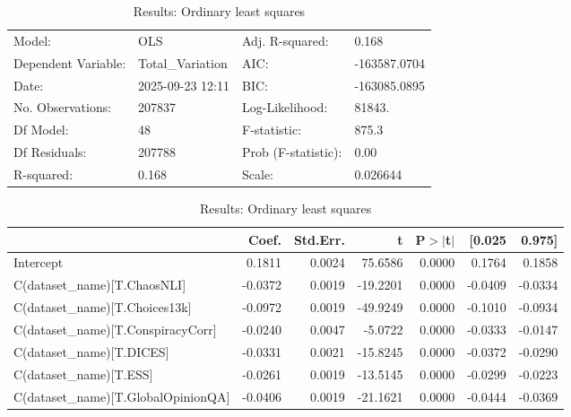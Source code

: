 \documentclass{article} %
\begin{document}
\begin{table}
\tiny
\caption{Results: Ordinary least squares}
\label{tab:regression_entropy}
\begin{center}
\begin{tabular}{llll}
\hline
Model:              & OLS              & Adj. R-squared:     & 0.168         \\
Dependent Variable: & Total\_Variation & AIC:                & -163587.0704  \\
Date:               & 2025-09-23 12:11 & BIC:                & -163085.0895  \\
No. Observations:   & 207837           & Log-Likelihood:     & 81843.        \\
Df Model:           & 48               & F-statistic:        & 875.3         \\
Df Residuals:       & 207788           & Prob (F-statistic): & 0.00          \\
R-squared:          & 0.168            & Scale:              & 0.026644      \\
\hline
\end{tabular}
\end{center}
\begin{center}
\begin{tabular}{lrrrrrr}
\hline
                                                       &   Coef. & Std.Err. &         t & P$> |$t$|$ &  [0.025 &  0.975]  \\
\hline
Intercept                                              &  0.1811 &   0.0024 &   75.6586 &      0.0000 &  0.1764 &  0.1858  \\
C(dataset\_name)[T.ChaosNLI]                           & -0.0372 &   0.0019 &  -19.2201 &      0.0000 & -0.0409 & -0.0334  \\
C(dataset\_name)[T.Choices13k]                         & -0.0972 &   0.0019 &  -49.9249 &      0.0000 & -0.1010 & -0.0934  \\
C(dataset\_name)[T.ConspiracyCorr]                     & -0.0240 &   0.0047 &   -5.0722 &      0.0000 & -0.0333 & -0.0147  \\
C(dataset\_name)[T.DICES]                              & -0.0331 &   0.0021 &  -15.8245 &      0.0000 & -0.0372 & -0.0290  \\
C(dataset\_name)[T.ESS]                                & -0.0261 &   0.0019 &  -13.5145 &      0.0000 & -0.0299 & -0.0223  \\
C(dataset\_name)[T.GlobalOpinionQA]                    & -0.0406 &   0.0019 &  -21.1621 &      0.0000 & -0.0444 & -0.0369  \\

\end{tabular}
\end{center}
\end{table}
\end{document}
